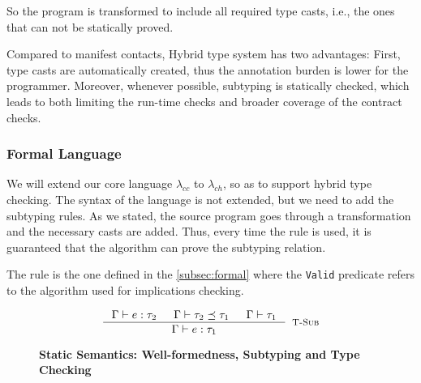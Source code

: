 So the program is transformed to include all required type casts, 
i.e., the ones that can not be statically proved.


Compared to manifest contacts, Hybrid type system has two advantages:
First, type casts are automatically created, thus the annotation burden is lower for
the programmer.
Moreover, whenever possible, subtyping is statically checked, which leads to both
limiting the run-time checks and broader coverage of the contract checks.

\subsubsection{Formal Language}
We will extend our core language $\lambda_{cc}$ to $\lambda_{ch}$,
so as to support hybrid type checking. 
The syntax of the language is not extended, but we need to add the subtyping rules.
As we stated, the source program goes through a transformation and the necessary casts are added.
Thus, every time the \tsub rule is used, it is guaranteed that the algorithm can prove
the subtyping relation.

The rule \tsub is the one defined in the \ref{subsec:formal}
where the \texttt{Valid} predicate refers to the algorithm used 
for implications checking.

\begin{figure}[ht!]
\medskip {}

$$\begin{array}{cc}

\inference
  {  \hastype{\Gamma}{e}{\tau_2} && \isSubType{\Gamma}{\tau_2}{\tau_1} 
  && \isWellFormed{\Gamma}{\tau_1}
  }
  {\hastype{\Gamma}{e}{\tau_1}}
  [\tsub]
\end{array}$$

\caption{\textbf{Static Semantics: Well-formedness, Subtyping and Type Checking}}
\label{fig:rules}
\end{figure}

 

